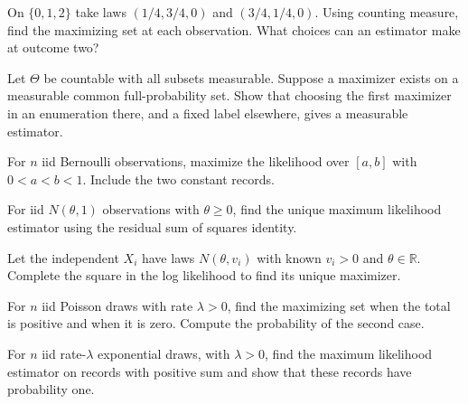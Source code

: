 \documentclass[11pt,oneside]{book}
\theoremstyle{definition}
\theoremstyle{remark}
\newcommand{\R}{\mathbb R}
\begin{document}
\begin{practiceexercise}
\label{pex:ml-impossible-record}
On $\{0,1,2\}$ take laws $(1/4,3/4,0)$ and $(3/4,1/4,0)$.
Using counting measure, find the maximizing set at each
observation. What choices can an estimator make at outcome two?
\end{practiceexercise}

\begin{practiceexercise}
\label{pex:ml-countable-first-maximizer}
Let $\Theta$ be countable with all subsets measurable. Suppose
a maximizer exists on a measurable common full-probability set.
Show that choosing the first maximizer in an enumeration there,
and a fixed label elsewhere, gives a measurable estimator.
\end{practiceexercise}

\begin{practiceexercise}
\label{pex:ml-bernoulli-clipped-constraint}
For $n$ iid Bernoulli observations, maximize the likelihood over
$[a,b]$ with $0<a<b<1$. Include the two constant records.
\end{practiceexercise}

\begin{practiceexercise}
\label{pex:ml-normal-half-line}
For iid $N(\theta,1)$ observations with $\theta\geq0$, find
the unique maximum likelihood estimator using the residual
sum of squares identity.
\end{practiceexercise}

\begin{practiceexercise}
\label{pex:ml-weighted-gaussian-location}
Let the independent $X_i$ have laws $N(\theta,v_i)$ with known
$v_i>0$ and $\theta\in\R$. Complete the square in the log
likelihood to find its unique maximizer.
\end{practiceexercise}

\begin{practiceexercise}
\label{pex:ml-poisson-zero-count}
For $n$ iid Poisson draws with rate $\lambda>0$, find the
maximizing set when the total is positive and when it is zero.
Compute the probability of the second case.
\end{practiceexercise}

\begin{practiceexercise}
\label{pex:ml-exponential-rate}
For $n$ iid rate-$\lambda$ exponential draws, with $\lambda>0$,
find the maximum likelihood estimator on records with positive
sum and show that these records have probability one.
\end{practiceexercise}
\end{document}
